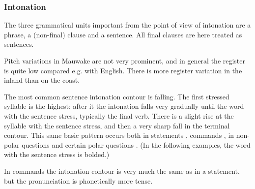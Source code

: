 \subsubsection{Intonation}\label{sec:2.1.3.2}


The three grammatical units important from the point of view of intonation are a phrase, a (non-final) clause and a sentence. All final clauses are here treated as sentences.

Pitch variations in Mauwake are not very prominent, and in general the register is quite low compared e.g. with English. There is more register variation in the inland than on the coast. 

The most common sentence intonation contour is falling. The first stressed syllable is the highest; after it the intonation falls very gradually until the word with the sentence stress, typically the final verb. There is a slight rise at the syllable with the sentence stress, and then a very sharp fall in the terminal contour.  This same basic pattern occurs both in statements , commands , in non-polar questions  and certain polar questions . (In the following examples, the word with the sentence stress is bolded.)




In commands the intonation contour is very much the same as in a statement, but the pronunciation is phonetically more tense.


